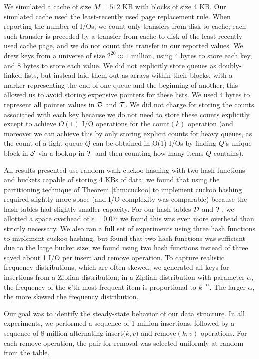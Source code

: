 \documentclass[11pt,letterpaper]{article}
\begin{document}
We simulated a cache of size $M=512$ KB with blocks of size 4 KB. 
Our simulated cache used the least-recently used page replacement rule. 
When reporting the number of I/Os, we count only transfers from disk to cache; 
each such transfer is preceded by a transfer from cache to disk of the least recently used cache page, 
and we do not count this transfer in our reported values. We drew keys from a universe of size $2^{20} \approx 1$ million, 
using $4$ bytes to store each key, and 8 bytes to store each value. We did not explicitly store queues as 
doubly-linked lists, but instead laid them out as arrays within their blocks, with a marker representing 
the end of one queue and the beginning of another; this allowed us to avoid storing expensive pointers for 
these lists. We used 4 bytes to represent all pointer values in $\cal D$ and $\cal T$. We did not 
charge for storing the counts associated with each key because we do not need to store these counts explicitly
except to achieve $O(1)$ I/O operations for the count$(k)$ operation (and moreover we can achieve 
this by only storing explicit counts for heavy queues, as the count of a light queue $Q$ can be 
obtained in O(1) I/Os by finding $Q$'s unique block in $\cal S$ via a lookup in $\cal T$ and then counting how many items $Q$ contains). 

All results presented use random-walk cuckoo hashing with two hash
functions and buckets capable of storing 4 KBs of data; we found that
using the partitioning technique of Theorem \ref{thm:cuckoo} to
implement cuckoo hashing required slightly more space (and I/O
complexity was comparable) because the hash tables had slightly
smaller capacity. 
For our hash tables $\cal D$ and $\cal T$, we allotted a space overhead of 
$\epsilon=0.07$; we found this was even more overhead than strictly necessary.
We also ran a full set of experiments using three
hash functions to implement cuckoo hashing, but found that two hash
functions was sufficient due to the large bucket size; we found using two hash
functions instead of three saved about 1 I/O per insert and remove
operation.
To capture realistic frequency distributions, which are often skewed, we generated all keys for insertions from a Zipfian distribution; in a Zipfian distribution with parameter $\alpha$, the frequency of the $k$'th most frequent item is proportional to $k^{-\alpha}$. The larger $\alpha$, the more skewed the frequency distribution.

Our goal was to identify the steady-state behavior of our data structure. In all experiments, we performed a sequence of 1 million insertions, followed by a sequence of 8 million alternating insert($k,v)$ and remove$(k,v)$ operations.  For each remove operation, the pair for removal was selected uniformly at random from the table. 
\end{document}
